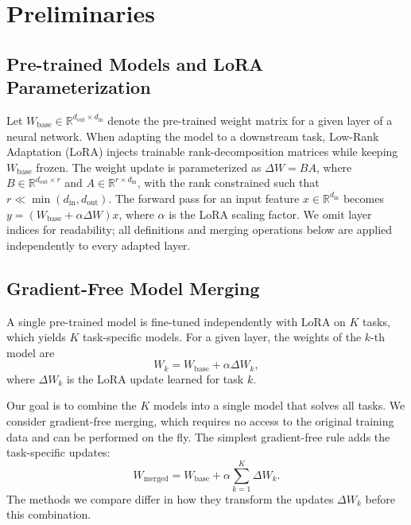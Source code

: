 \documentclass[10pt]{article} %
\begin{document}
\section{Preliminaries}

\subsection{Pre-trained Models and LoRA Parameterization} 
Let $W_{\text{base}} \in \mathbb{R}^{d_{\text{out}} \times d_{\text{in}}}$ denote the pre-trained weight matrix for a given layer of a neural network. When adapting the model to a downstream task, Low-Rank Adaptation (LoRA) injects trainable rank-decomposition matrices while keeping $W_{\text{base}}$ frozen. The weight update is parameterized as $\Delta W = B A$, where $B \in \mathbb{R}^{d_{\text{out}} \times r}$ and $A \in \mathbb{R}^{r \times d_{\text{in}}}$, with the rank constrained such that $r \ll \min(d_{\text{in}}, d_{\text{out}})$. The forward pass for an input feature $x \in \mathbb{R}^{d_{\text{in}}}$ becomes $y = (W_{\text{base}} + \alpha\Delta W)x$, where $\alpha$ is the LoRA scaling factor. We omit layer indices for readability; all definitions and merging operations below are applied independently to every adapted layer.

\subsection{Gradient-Free Model Merging}
A single pre-trained model is fine-tuned independently with LoRA on $K$ tasks, which yields $K$ task-specific models. For a given layer, the weights of the $k$-th model are
$$W_k = W_{\text{base}} + \alpha \Delta W_k,$$
where $\Delta W_k$ is the LoRA update learned for task $k$.

Our goal is to combine the $K$ models into a single model that solves all tasks. We consider gradient-free merging, which requires no access to the original training data and can be performed on the fly. The simplest gradient-free rule adds the task-specific updates:
$$W_{\text{merged}} = W_{\text{base}} + \alpha\sum_{k=1}^K \Delta W_k.$$
The methods we compare differ in how they transform the updates $\Delta W_k$ before this combination.

\end{document}
